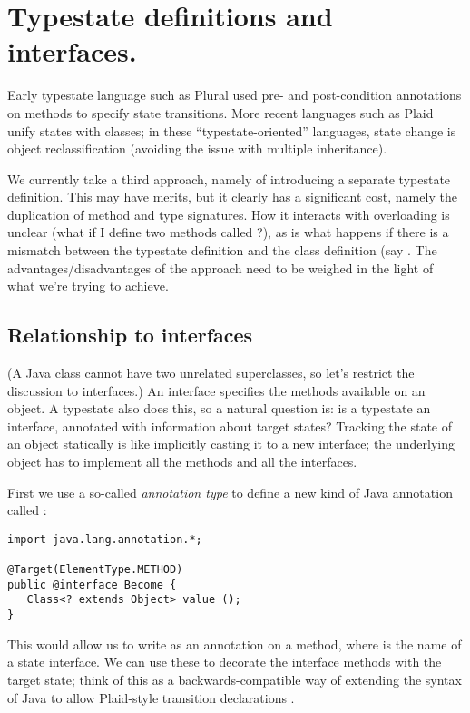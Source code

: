 \section{Typestate definitions and interfaces.}

Early typestate language such as Plural \cite{bierhoff11} used pre-
and post-condition annotations on methods to specify state
transitions. More recent languages such as Plaid \cite{garcia14} unify
states with classes; in these ``typestate-oriented'' languages, state
change is object reclassification (avoiding the issue with multiple
inheritance).

We currently take a third approach, namely of introducing a separate
typestate definition. This may have merits, but it clearly has a
significant cost, namely the duplication of method and type
signatures. How it interacts with overloading is unclear (what if I
define two methods called ?), as is what happens if there is
a mismatch between the typestate definition and the class definition
(say . The advantages/disadvantages of the approach need to be weighed
in the light of what we're trying to achieve.

\subsection{Relationship to interfaces}

(A Java class cannot have two unrelated superclasses, so let's
restrict the discussion to interfaces.) An interface specifies the
methods available on an object. A typestate also does this, so a
natural question is: is a typestate an interface, annotated with
information about target states? Tracking the state of an object
statically is like implicitly casting it to a new interface; the
underlying object has to implement all the methods and all the
interfaces.

First we use a so-called \emph{annotation type} to define a new kind
of Java annotation called :

\begin{lstlisting}
import java.lang.annotation.*;

@Target(ElementType.METHOD)
public @interface Become {
   Class<? extends Object> value ();
}
\end{lstlisting}

\noindent This would allow us to write  as
an annotation on a method, where  is the name of a state
interface. We can use these to decorate the interface methods with the
target state; think of this as a backwards-compatible way of extending
the syntax of Java to allow Plaid-style transition declarations
\cite{garcia14}.

